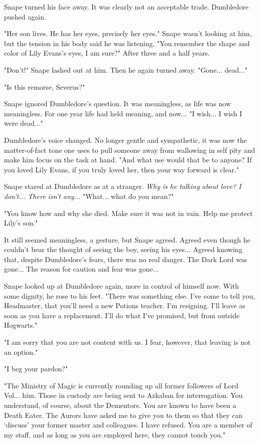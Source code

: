 Snape turned his face away. It was clearly not an acceptable trade. Dumbledore pushed again.

"Her son lives. He has her eyes, precisely her eyes." Snape wasn't looking at him, but the tension in his body said he was listening. "You remember the shape and color of Lily Evans's eyes, I am sure?" After three and a half years.

"Don't!" Snape lashed out at him. Then he again turned away. "Gone... dead..."

"Is this remorse, Severus?"

Snape ignored Dumbledore's question. It was meaningless, as life was now meaningless. For one year life had held meaning, and now... "I wish... I wish I were dead..."

Dumbledore's voice changed. No longer gentle and sympathetic, it was now the matter-of-fact tone one uses to pull someone away from wallowing in self pity and make him focus on the task at hand. "And what use would that be to anyone? If you loved Lily Evans, if you truly loved her, then your way forward is clear."

Snape stared at Dumbledore as at a stranger. \emph{Why is he talking about love? I don't... There isn't any...} "What... what do you mean?"

"You know how and why she died. Make sure it was not in vain. Help me protect Lily's son."

It still seemed meaningless, a gesture, but Snape agreed. Agreed even though he couldn't bear the thought of seeing the boy, seeing his eyes... Agreed knowing that, despite Dumbledore's fears, there was no real danger. The Dark Lord was gone... The reason for caution and fear was gone...

Snape looked up at Dumbledore again, more in control of himself now. With some dignity, he rose to his feet. "There was something else. I've come to tell you, Headmaster, that you'll need a new Potions teacher. I'm resigning. I'll leave as soon as you have a replacement. I'll do what I've promised, but from outside Hogwarts."

"I am sorry that you are not content with us. I fear, however, that leaving is not an option."

"I beg your pardon?"

"The Ministry of Magic is currently rounding up all former followers of Lord Vol... him. Those in custody are being sent to Azkaban for interrogation. You understand, of course, about the Dementors. You are known to have been a Death Eater. The Aurors have asked me to give you to them so that they can `discuss' your former master and colleagues. I have refused. You are a member of my staff, and as long as you are employed here, they cannot touch you."


